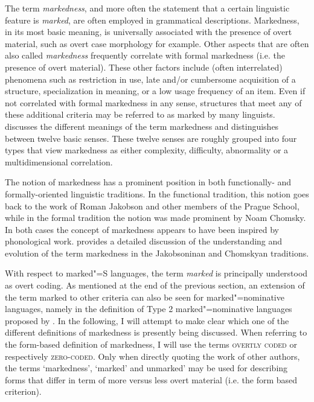 The term \textit{markedness}, and more often the statement that a certain linguistic feature is \textit{marked}, are often employed in grammatical descriptions.
Markedness, in its most basic meaning, is universally associated with the presence of overt material, such as overt case morphology for example. 
Other aspects that are often also called \textit{markedness} frequently correlate with formal markedness (i.e. the presence of overt material). 
These other factors include (often interrelated) phenomena such as restriction in use, late and/or cumbersome acquisition of a structure, specialization in meaning, or a low usage frequency of an item. 
Even if not correlated with formal markedness in any sense, structures that meet any of these additional criteria may be referred to as marked by many linguists. 
\citet{Haspelmath.mark:2006} discusses the different meanings of the term markedness and distinguishes between twelve basic senses. 
These twelve senses are roughly grouped into four types that view markedness as either complexity, difficulty, abnormality or a multidimensional correlation. 

The notion of markedness has a prominent position in both functionally- and formally-oriented linguistic traditions. 
In the functional tradition, this notion goes back to the work of Roman Jakobson and other members of the Prague School, while in the formal tradition the notion was made prominent by Noam Chomsky.
In both cases the concept of markedness appears to have been inspired by phonological work.
\citet{Battistella:1996} provides a detailed discussion of the understanding and evolution of the term markedness in the Jakobsoninan and Chomskyan traditions. 

With respect to marked"=S languages, the term \textit{marked} is principally understood as overt coding. 
As mentioned at the end of the previous section, an extension of the term marked to other criteria can also be seen for marked"=nominative languages, namely in the definition of Type 2 marked"=nominative languages proposed by \citet{Koenig:2006}. 
In the following, I will attempt to make clear which one of the different definitions of markedness is presently being discussed.
When referring to the form-based definition of markedness, I will use the terms \textsc{overtly coded} or respectively \textsc{zero-coded}. 
Only when directly quoting the work of other authors, the terms `markedness', `marked' and  unmarked' may be used for describing forms that differ in term of more versus less overt material (i.e. the form based criterion). 


